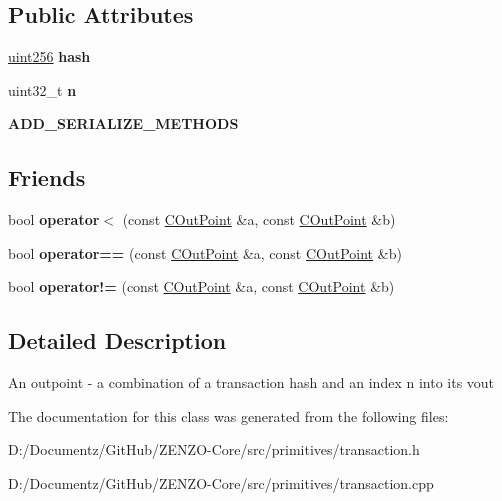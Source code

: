 \subsection*{Public Attributes}
\begin{DoxyCompactItemize}
\item 
\mbox{\label{class_c_out_point_af131c7194a660558b0ff158f4efa7a28}} 
\mbox{\hyperlink{classuint256}{uint256}} {\bfseries hash}
\item 
\mbox{\label{class_c_out_point_a1b857e3a0412ff741da2c9f8defe315c}} 
uint32\+\_\+t {\bfseries n}
\item 
\mbox{\label{class_c_out_point_ac025da4b121ed1bca9a4d88bcb9d3a90}} 
{\bfseries A\+D\+D\+\_\+\+S\+E\+R\+I\+A\+L\+I\+Z\+E\+\_\+\+M\+E\+T\+H\+O\+DS}
\end{DoxyCompactItemize}
\subsection*{Friends}
\begin{DoxyCompactItemize}
\item 
\mbox{\label{class_c_out_point_a83395b7e70479c621c95e1a0d7f2497c}} 
bool {\bfseries operator$<$} (const \mbox{\hyperlink{class_c_out_point}{C\+Out\+Point}} \&a, const \mbox{\hyperlink{class_c_out_point}{C\+Out\+Point}} \&b)
\item 
\mbox{\label{class_c_out_point_a30d4f5afdf664bb4ea5a3496bbc2bd12}} 
bool {\bfseries operator==} (const \mbox{\hyperlink{class_c_out_point}{C\+Out\+Point}} \&a, const \mbox{\hyperlink{class_c_out_point}{C\+Out\+Point}} \&b)
\item 
\mbox{\label{class_c_out_point_a212e1733899b0444f0e4e1e3deae33b1}} 
bool {\bfseries operator!=} (const \mbox{\hyperlink{class_c_out_point}{C\+Out\+Point}} \&a, const \mbox{\hyperlink{class_c_out_point}{C\+Out\+Point}} \&b)
\end{DoxyCompactItemize}


\subsection{Detailed Description}
An outpoint -\/ a combination of a transaction hash and an index n into its vout 

The documentation for this class was generated from the following files\+:\begin{DoxyCompactItemize}
\item 
D\+:/\+Documentz/\+Git\+Hub/\+Z\+E\+N\+Z\+O-\/\+Core/src/primitives/transaction.\+h\item 
D\+:/\+Documentz/\+Git\+Hub/\+Z\+E\+N\+Z\+O-\/\+Core/src/primitives/transaction.\+cpp\end{DoxyCompactItemize}
